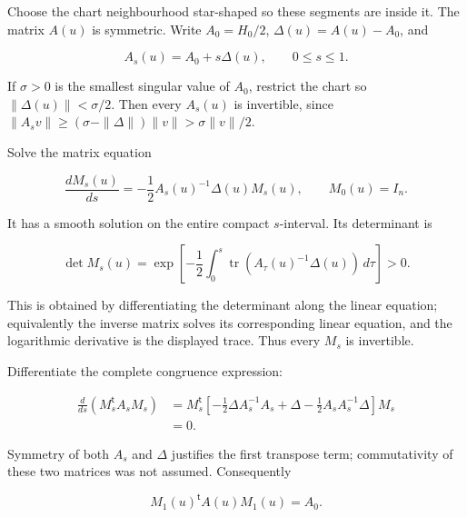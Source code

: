 Choose the chart neighbourhood star-shaped so these segments are inside it. The matrix \(A(u)\) is symmetric. Write \(A_0=H_0/2\), \(\Delta(u)=A(u)-A_0\), and

\begin{equation}
A_s(u)=A_0+s\Delta(u),\qquad 0\leq s\leq1.
\label{courseIII:relative-morse-functions-and-original-handles:eq:2.3}
\end{equation}

If \(\sigma>0\) is the smallest singular value of \(A_0\), restrict the chart so \(\|\Delta(u)\|<\sigma/2\). Then every \(A_s(u)\) is invertible, since
\(\|A_s v\|\geq(\sigma-\|\Delta\|)\|v\|>\sigma\|v\|/2\).

Solve the matrix equation

\begin{equation}
\frac{dM_s(u)}{ds}
=-\frac12A_s(u)^{-1}\Delta(u)M_s(u),\qquad M_0(u)=I_n.
\label{courseIII:relative-morse-functions-and-original-handles:eq:2.4}
\end{equation}

It has a smooth solution on the entire compact \(s\)-interval. Its determinant is

\begin{equation}
\det M_s(u)=
\exp\left[-\frac12\int_0^s
\operatorname{tr}(A_\tau(u)^{-1}\Delta(u))\,d\tau\right]>0.
\label{courseIII:relative-morse-functions-and-original-handles:eq:2.5}
\end{equation}

This is obtained by differentiating the determinant along the linear equation; equivalently the inverse matrix solves its corresponding linear equation, and the logarithmic derivative is the displayed trace. Thus every \(M_s\) is invertible.

Differentiate the complete congruence expression:

\begin{equation}
\begin{aligned}
\frac{d}{ds}(M_s^{\mathsf t}A_sM_s)
&=M_s^{\mathsf t}
\left[-\frac12\Delta A_s^{-1}A_s
+\Delta-\frac12A_sA_s^{-1}\Delta\right]M_s\\
&=0.
\end{aligned}
\label{courseIII:relative-morse-functions-and-original-handles:eq:2.6}
\end{equation}

Symmetry of both \(A_s\) and \(\Delta\) justifies the first transpose term; commutativity of these two matrices was not assumed. Consequently

\begin{equation}
M_1(u)^{\mathsf t}A(u)M_1(u)=A_0.
\label{courseIII:relative-morse-functions-and-original-handles:eq:2.7}
\end{equation}


